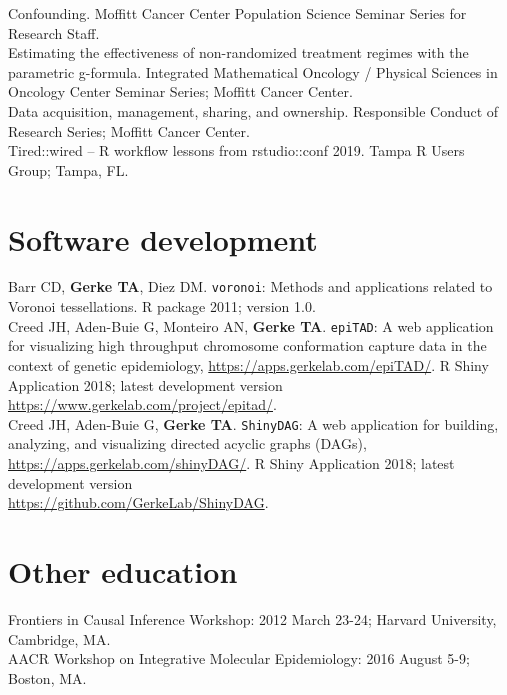 \documentclass[11pt, a4paper]{article} %
\newcommand{\years}[1]{\marginnote{\scriptsize \raise .3ex\hbox{#1}}} %
\begin{document}
\years{2017}Confounding. Moffitt Cancer Center Population Science Seminar Series for Research Staff.\\
\years{2018}Estimating the effectiveness of non-randomized treatment regimes with the parametric g-formula. Integrated Mathematical Oncology / Physical Sciences in Oncology Center Seminar Series; Moffitt Cancer Center.\\
\years{2018} Data acquisition, management, sharing, and ownership. Responsible Conduct of Research Series; Moffitt Cancer Center.\\
\years{2019} Tired::wired -- R workflow lessons from rstudio::conf 2019. Tampa R Users Group; Tampa, FL.\\

\section*{Software development}
Barr CD, {\bf Gerke TA}, Diez DM. \verb|voronoi|: Methods and applications related to Voronoi tessellations. R package 2011; version 1.0.\\

Creed JH, Aden-Buie G, Monteiro AN, {\bf Gerke TA}. \verb|epiTAD|: A web application for visualizing high throughput chromosome conformation capture data in the context of genetic epidemiology, \href{https://apps.gerkelab.com/epiTAD/}{https://apps.gerkelab.com/epiTAD/}. R Shiny Application 2018; latest development version \href{https://www.gerkelab.com/project/epitad/}{https://www.gerkelab.com/project/epitad/}.\\

Creed JH, Aden-Buie G, {\bf Gerke TA}. \verb|ShinyDAG|: A web application for building, analyzing, and visualizing directed acyclic graphs (DAGs), \href{https://apps.gerkelab.com/shinyDAG/}{https://apps.gerkelab.com/shinyDAG/}. R Shiny Application 2018; latest development version \\\href{https://github.com/GerkeLab/ShinyDAG}{https://github.com/GerkeLab/ShinyDAG}.

\section*{Other education}
Frontiers in Causal Inference Workshop: 2012 March 23-24; Harvard University, Cambridge, MA.\\

AACR Workshop on Integrative Molecular Epidemiology: 2016 August 5-9; Boston, MA.\\
\end{document}
